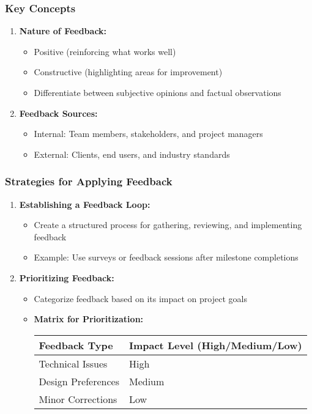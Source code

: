 \documentclass[aspectratio=169]{beamer}
\begin{document}
\begin{frame}[fragile]
    \frametitle{Key Concepts}
    \begin{enumerate}
        \item \textbf{Nature of Feedback:}
        \begin{itemize}
            \item Positive (reinforcing what works well)
            \item Constructive (highlighting areas for improvement)
            \item Differentiate between subjective opinions and factual observations
        \end{itemize}
        
        \item \textbf{Feedback Sources:}
        \begin{itemize}
            \item Internal: Team members, stakeholders, and project managers
            \item External: Clients, end users, and industry standards
        \end{itemize}
    \end{enumerate}
\end{frame}

\begin{frame}[fragile]
    \frametitle{Strategies for Applying Feedback}
    \begin{enumerate}
        \item \textbf{Establishing a Feedback Loop:}
        \begin{itemize}
            \item Create a structured process for gathering, reviewing, and implementing feedback
            \item Example: Use surveys or feedback sessions after milestone completions
        \end{itemize}
        
        \item \textbf{Prioritizing Feedback:}
        \begin{itemize}
            \item Categorize feedback based on its impact on project goals
            \item \textbf{Matrix for Prioritization:}
            \begin{tabular}{|l|l|}
                \hline
                Feedback Type      & Impact Level (High/Medium/Low) \\
                \hline
                Technical Issues   & High                            \\
                Design Preferences  & Medium                          \\
                Minor Corrections   & Low                             \\
                \hline
            \end{tabular}
        \end{itemize}
    \end{enumerate}
\end{frame}
\end{document}
